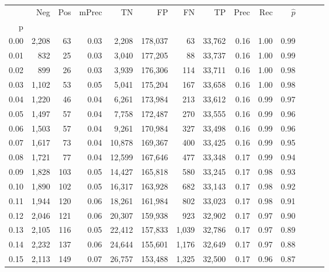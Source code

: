 \begin{tabular}{rrrrrrrrrrrrrr}
\toprule
{} &    Neg &  Pos & mPrec &       TN &       FP &      FN &      TP &  Prec &   Rec & $\hat{p}$ \\
p    &        &      &       &          &          &         &         &       &       &           \\
\midrule
0.00 &  2,208 &   63 &  0.03 &    2,208 &  178,037 &      63 &  33,762 &  0.16 &  1.00 &      0.99 \\
0.01 &    832 &   25 &  0.03 &    3,040 &  177,205 &      88 &  33,737 &  0.16 &  1.00 &      0.99 \\
0.02 &    899 &   26 &  0.03 &    3,939 &  176,306 &     114 &  33,711 &  0.16 &  1.00 &      0.98 \\
0.03 &  1,102 &   53 &  0.05 &    5,041 &  175,204 &     167 &  33,658 &  0.16 &  1.00 &      0.98 \\
0.04 &  1,220 &   46 &  0.04 &    6,261 &  173,984 &     213 &  33,612 &  0.16 &  0.99 &      0.97 \\
0.05 &  1,497 &   57 &  0.04 &    7,758 &  172,487 &     270 &  33,555 &  0.16 &  0.99 &      0.96 \\
0.06 &  1,503 &   57 &  0.04 &    9,261 &  170,984 &     327 &  33,498 &  0.16 &  0.99 &      0.96 \\
0.07 &  1,617 &   73 &  0.04 &   10,878 &  169,367 &     400 &  33,425 &  0.16 &  0.99 &      0.95 \\
0.08 &  1,721 &   77 &  0.04 &   12,599 &  167,646 &     477 &  33,348 &  0.17 &  0.99 &      0.94 \\
0.09 &  1,828 &  103 &  0.05 &   14,427 &  165,818 &     580 &  33,245 &  0.17 &  0.98 &      0.93 \\
0.10 &  1,890 &  102 &  0.05 &   16,317 &  163,928 &     682 &  33,143 &  0.17 &  0.98 &      0.92 \\
0.11 &  1,944 &  120 &  0.06 &   18,261 &  161,984 &     802 &  33,023 &  0.17 &  0.98 &      0.91 \\
0.12 &  2,046 &  121 &  0.06 &   20,307 &  159,938 &     923 &  32,902 &  0.17 &  0.97 &      0.90 \\
0.13 &  2,105 &  116 &  0.05 &   22,412 &  157,833 &   1,039 &  32,786 &  0.17 &  0.97 &      0.89 \\
0.14 &  2,232 &  137 &  0.06 &   24,644 &  155,601 &   1,176 &  32,649 &  0.17 &  0.97 &      0.88 \\
0.15 &  2,113 &  149 &  0.07 &   26,757 &  153,488 &   1,325 &  32,500 &  0.17 &  0.96 &      0.87 \\

\end{tabular}
